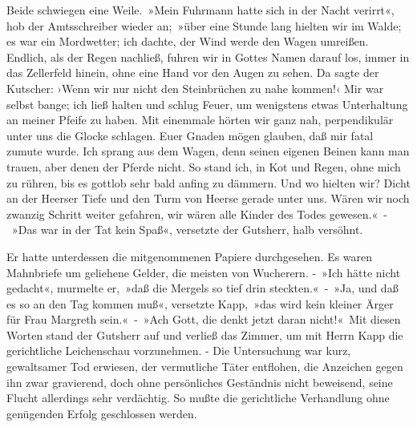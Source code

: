 Beide schwiegen eine Weile. »Mein Fuhrmann hatte sich in der Nacht verirrt«, hob der Amtsschreiber wieder an; »über eine Stunde lang hielten wir im Walde; es war ein Mordwetter; ich dachte, der Wind werde den Wagen umreißen. Endlich, als der Regen nachließ, fuhren wir in Gottes Namen darauf los, immer in das Zellerfeld hinein, ohne eine Hand vor den Augen zu sehen. Da sagte der Kutscher: ›Wenn wir nur nicht den Steinbrüchen zu nahe kommen!‹ Mir war selbst bange; ich ließ halten und schlug Feuer, um wenigstens etwas Unterhaltung an meiner Pfeife zu haben. Mit einemmale hörten wir ganz nah, perpendikulär unter uns die Glocke schlagen. Euer Gnaden mögen glauben, daß mir fatal zumute wurde. Ich sprang aus dem Wagen, denn seinen eigenen Beinen kann man trauen, aber denen der Pferde nicht. So stand ich, in Kot und Regen, ohne mich zu rühren, bis es gottlob sehr bald anfing zu dämmern. Und wo hielten wir? Dicht an der Heerser Tiefe und den Turm von Heerse gerade unter uns. Wären wir noch zwanzig Schritt weiter gefahren, wir wären alle Kinder des Todes gewesen.« - »Das war in der Tat kein Spaß«, versetzte der Gutsherr, halb versöhnt.

Er hatte unterdessen die mitgenommenen Papiere durchgesehen. Es waren Mahnbriefe um geliehene Gelder, die meisten von Wucherern. - »Ich hätte nicht gedacht«, murmelte er, »daß die Mergels so tief drin steckten.« - »Ja, und daß es so an den Tag kommen muß«, versetzte Kapp, »das wird kein kleiner Ärger für Frau Margreth sein.« - »Ach Gott, die denkt jetzt daran nicht!« Mit diesen Worten stand der Gutsherr auf und verließ das Zimmer, um mit Herrn Kapp die gerichtliche Leichenschau vorzunehmen. - Die Untersuchung war kurz, gewaltsamer Tod erwiesen, der vermutliche Täter entflohen, die Anzeichen gegen ihn zwar gravierend, doch ohne persönliches Geständnis nicht beweisend, seine Flucht allerdings sehr verdächtig. So mußte die gerichtliche Verhandlung ohne genügenden Erfolg geschlossen werden.

